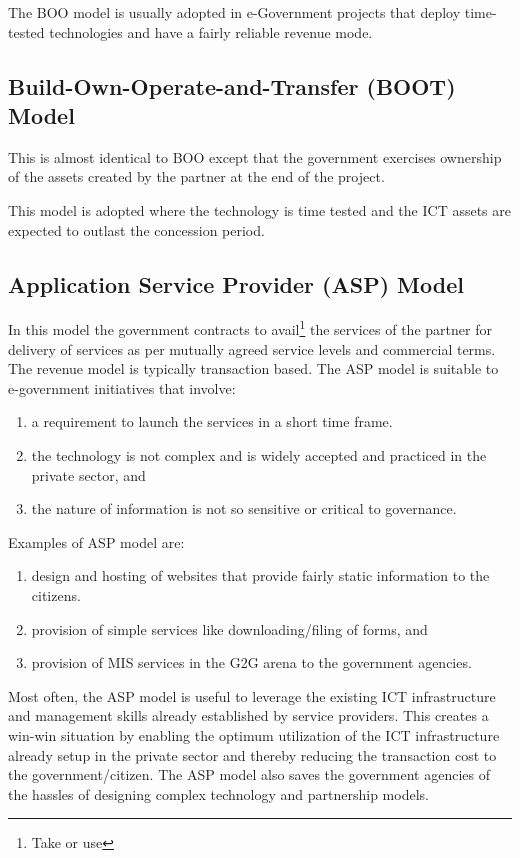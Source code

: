 The BOO model is usually adopted in e-Government projects that deploy time-tested technologies and have a fairly reliable revenue mode.

\subsection[BOOT Model]{Build-Own-Operate-and-Transfer (BOOT) Model}
This is almost identical to BOO except that the government exercises ownership of the assets created by the partner at the end of the project. 

This model is adopted where the technology is time tested and the ICT assets are expected to outlast the concession period.

\subsection[ASP Model]{Application Service Provider (ASP) Model}
In this model the government contracts to avail\footnote{Take or use} the services of the partner for delivery of services as per mutually agreed service levels and commercial terms. The revenue model is typically transaction based. The ASP model is suitable to e-government initiatives that involve:

\begin{enumerate}[label=(\alph*)]
	\item a requirement to launch the services in a short time frame.
	\item the technology is not complex and is widely accepted and practiced in the private sector, and
	\item the nature of information is not so sensitive or critical to governance.
\end{enumerate}

Examples of ASP model are:
\begin{enumerate}[label=(\roman*)]
	\item design and hosting of websites that provide fairly static information to the citizens.
	\item provision of simple services like downloading/filing of forms, and
	\item provision of MIS services in the G2G arena to the government agencies.
\end{enumerate}

Most often, the ASP model is useful to leverage the existing ICT infrastructure and management skills already established by service providers. This creates a win-win situation by enabling the optimum utilization of the ICT infrastructure already setup in the private sector and thereby reducing the transaction cost to the government/citizen. The ASP model also saves the government agencies of the hassles of designing complex technology and partnership models.


